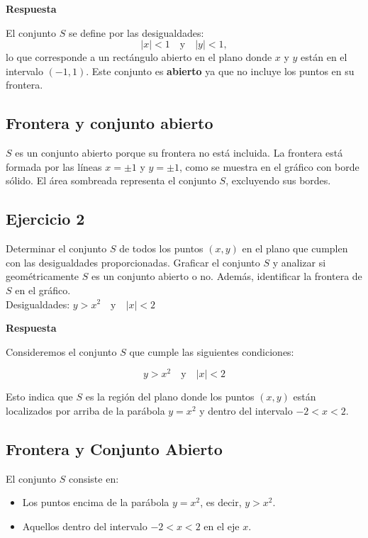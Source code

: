 \documentclass{report}
\begin{document}
    \textbf{Respuesta}

    El conjunto $S$ se define por las desigualdades:
    \[
    |x| < 1 \quad \text{y} \quad |y| < 1,
    \]
    lo que corresponde a un rectángulo abierto en el plano donde \( x \) y \( y \) están en el intervalo \( (-1, 1) \). Este conjunto es \textbf{abierto} ya que no incluye los puntos en su frontera.
    \subsection*{Frontera y conjunto abierto}

    $S$ es un conjunto abierto porque su frontera no está incluida. La frontera está formada por las líneas \( x = \pm 1 \) y \( y = \pm 1 \), como se muestra en el gráfico con borde sólido. El área sombreada representa el conjunto $S$, excluyendo sus bordes.\subsection*{Ejercicio 2}
    Determinar el conjunto \( S \) de todos los puntos \( (x, y) \) en el plano que cumplen con las desigualdades proporcionadas. Graficar el conjunto \( S \) y analizar si geométricamente \( S \) es un conjunto abierto o no. Además, identificar la frontera de \( S \) en el gráfico.\\
    Desigualdades: \( y > x^{2} \quad \text{y} \quad |x|<2 \)

    \textbf{Respuesta}

    Consideremos el conjunto \( S \) que cumple las siguientes condiciones:

    \[
    y > x^2 \quad \text{y} \quad |x| < 2
    \]

    Esto indica que \( S \) es la región del plano donde los puntos \( (x, y) \) están localizados por arriba de la parábola \( y = x^2 \) y dentro del intervalo \( -2 < x < 2 \).

    \subsection*{Frontera y Conjunto Abierto}

    El conjunto \( S \) consiste en:
    \begin{itemize}
        \item Los puntos encima de la parábola \( y = x^2 \), es decir, \( y > x^2 \).
        \item Aquellos dentro del intervalo \( -2 < x < 2 \) en el eje \( x \).
    \end{itemize}
\end{document}
